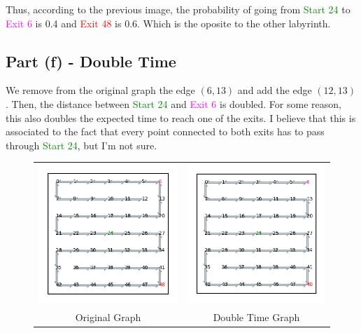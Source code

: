 Thus, according to the previous image, the probability of going from \textcolor{Green}{Start 24} to \textcolor{magenta}{Exit 6} is 0.4 and \textcolor{red}{Exit 48} is 0.6. Which is the oposite to the other labyrinth.

\subsection*{Part (f) - Double Time}

We remove from the original graph the edge $(6,13)$ and add the edge $(12,13)$. Then, the distance between \textcolor{Green}{Start 24} and \textcolor{magenta}{Exit 6} is doubled. For some reason, this also doubles the expected time to reach one of the exits. I believe that this is associated to the fact that every point connected to both exits has to pass through \textcolor{Green}{Start 24}, but I'm not sure.

\begin{figure}[H]
    \begin{tabular}{cc}
      \includegraphics[width=70mm]{../pictures/216-4.png} &   \includegraphics[width=70mm]{../pictures/432-4.png} \\
    Original Graph & Double Time Graph \\[6pt]
    \end{tabular}
\end{figure}

